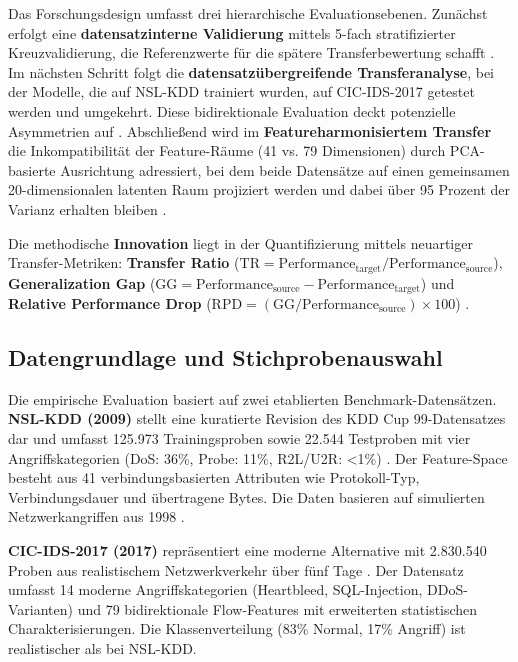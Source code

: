 \documentclass[11pt,a4paper]{article}
\begin{document}
    Das Forschungsdesign umfasst drei hierarchische Evaluationsebenen. Zunächst erfolgt eine \textbf{datensatzinterne Validierung} mittels 5-fach stratifizierter Kreuzvalidierung, die Referenzwerte für die spätere Transferbewertung schafft \parencite{Tavallaee2009}. Im nächsten Schritt folgt die \textbf{datensatzübergreifende Transferanalyse}, bei der Modelle, die auf NSL-KDD trainiert wurden, auf CIC-IDS-2017 getestet werden und umgekehrt. Diese bidirektionale Evaluation deckt potenzielle Asymmetrien auf \parencite{Ring2019}. Abschließend wird im \textbf{Featureharmonisiertem Transfer} die Inkompatibilität der Feature-Räume (41 vs. 79 Dimensionen) durch PCA-basierte Ausrichtung adressiert, bei dem beide Datensätze auf einen gemeinsamen 20-dimensionalen latenten Raum projiziert werden und dabei über 95 Prozent der Varianz erhalten bleiben \parencite{Goodfellow2016}.

    Die methodische \textbf{Innovation} liegt in der Quantifizierung mittels neuartiger Transfer-Metriken: \textbf{Transfer Ratio} ($\text{TR} = \text{Performance}_{\text{target}} / \text{Performance}_{\text{source}}$), \textbf{Generalization Gap} ($\text{GG} = \text{Performance}_{\text{source}} - \text{Performance}_{\text{target}}$) und \textbf{Relative Performance Drop} ($\text{RPD} = (\text{GG} / \text{Performance}_{\text{source}}) \times 100$) \parencite{Mourouzis2021}.


    \subsection{Datengrundlage und Stichprobenauswahl}

    Die empirische Evaluation basiert auf zwei etablierten Benchmark-Datensätzen. \textbf{NSL-KDD (2009)} stellt eine kuratierte Revision des KDD Cup 99-Datensatzes dar und umfasst 125.973 Trainingsproben sowie 22.544 Testproben mit vier Angriffskategorien (DoS: 36\%, Probe: 11\%, R2L/U2R: <1\%) \parencite{Tavallaee2009}. Der Feature-Space besteht aus 41 verbindungsbasierten Attributen wie Protokoll-Typ, Verbindungsdauer und übertragene Bytes. Die Daten basieren auf simulierten Netzwerkangriffen aus 1998 \parencite{McHugh2000}.

    \textbf{CIC-IDS-2017 (2017)} repräsentiert eine moderne Alternative mit 2.830.540 Proben aus realistischem Netzwerkverkehr über fünf Tage \parencite{Sharafaldin2018}. Der Datensatz umfasst 14 moderne Angriffskategorien (Heartbleed, SQL-Injection, DDoS-Varianten) und 79 bidirektionale Flow-Features mit erweiterten statistischen Charakterisierungen. Die Klassenverteilung (83\% Normal, 17\% Angriff) ist realistischer als bei NSL-KDD.
\end{document}
